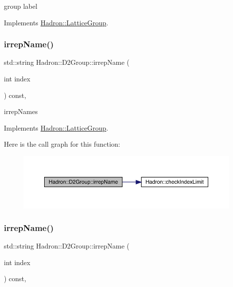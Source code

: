 group label 

Implements \mbox{\hyperlink{structHadron_1_1LatticeGroup_a82208a322bf1b1db489f16af38e70087}{Hadron\+::\+Lattice\+Group}}.

\mbox{\label{structHadron_1_1D2Group_a502111e32a238c50b248b9f7b0625385}} 
\subsubsection{\texorpdfstring{irrepName()}{irrepName()}\hspace{0.1cm}{\footnotesize\ttfamily [1/2]}}
{\footnotesize\ttfamily std\+::string Hadron\+::\+D2\+Group\+::irrep\+Name (\begin{DoxyParamCaption}\item[{int}]{index }\end{DoxyParamCaption}) const\hspace{0.3cm}{\ttfamily [inline]}, {\ttfamily [virtual]}}

irrep\+Names 

Implements \mbox{\hyperlink{structHadron_1_1LatticeGroup_a4bc5620218c2a73157e19bc4451fe746}{Hadron\+::\+Lattice\+Group}}.

Here is the call graph for this function\+:
\nopagebreak
\begin{figure}[H]
\begin{center}
\leavevmode
\includegraphics[width=350pt]{d8/de7/structHadron_1_1D2Group_a502111e32a238c50b248b9f7b0625385_cgraph}
\end{center}
\end{figure}
\mbox{\label{structHadron_1_1D2Group_a502111e32a238c50b248b9f7b0625385}} 
\subsubsection{\texorpdfstring{irrepName()}{irrepName()}\hspace{0.1cm}{\footnotesize\ttfamily [2/2]}}
{\footnotesize\ttfamily std\+::string Hadron\+::\+D2\+Group\+::irrep\+Name (\begin{DoxyParamCaption}\item[{int}]{index }\end{DoxyParamCaption}) const\hspace{0.3cm}{\ttfamily [inline]}, {\ttfamily [virtual]}}

